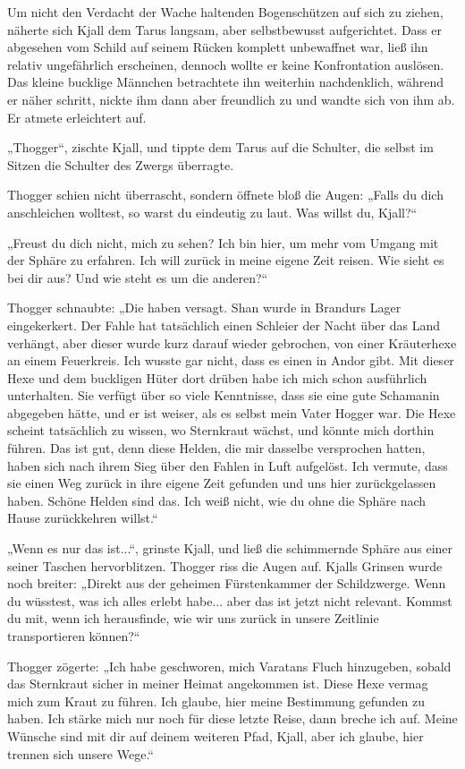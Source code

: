 \documentclass[10pt, a4paper, oneside]{book}
\begin{document}
Um nicht den Verdacht der Wache haltenden Bogenschützen auf sich zu ziehen, näherte sich Kjall dem Tarus langsam, aber selbstbewusst aufgerichtet. Dass er abgesehen vom Schild auf seinem Rücken komplett unbewaffnet war, ließ ihn relativ ungefährlich erscheinen, dennoch wollte er keine Konfrontation auslösen. Das kleine bucklige Männchen betrachtete ihn weiterhin nachdenklich, während er näher schritt, nickte ihm dann aber freundlich zu und wandte sich von ihm ab. Er atmete erleichtert auf.

„Thogger“, zischte Kjall, und tippte dem Tarus auf die Schulter, die selbst im Sitzen die Schulter des Zwergs überragte.

Thogger schien nicht überrascht, sondern öffnete bloß die Augen: „Falls du dich anschleichen wolltest, so warst du eindeutig zu laut. Was willst du, Kjall?“

„Freust du dich nicht, mich zu sehen? Ich bin hier, um mehr vom Umgang mit der Sphäre zu erfahren. Ich will zurück in meine eigene Zeit reisen. Wie sieht es bei dir aus? Und wie steht es um die anderen?“

Thogger schnaubte: „Die haben versagt. Shan wurde in Brandurs Lager eingekerkert. Der Fahle hat tatsächlich einen Schleier der Nacht über das Land verhängt, aber dieser wurde kurz darauf wieder gebrochen, von einer Kräuterhexe an einem Feuerkreis. Ich wusste gar nicht, dass es einen in Andor gibt. Mit dieser Hexe und dem buckligen Hüter dort drüben habe ich mich schon ausführlich unterhalten. Sie verfügt über so viele Kenntnisse, dass sie eine gute Schamanin abgegeben hätte, und er ist weiser, als es selbst mein Vater Hogger war. Die Hexe scheint tatsächlich zu wissen, wo Sternkraut wächst, und könnte mich dorthin führen. Das ist gut, denn diese Helden, die mir dasselbe versprochen hatten, haben sich nach ihrem Sieg über den Fahlen in Luft aufgelöst. Ich vermute, dass sie einen Weg zurück in ihre eigene Zeit gefunden und uns hier zurückgelassen haben. Schöne Helden sind das. Ich weiß nicht, wie du ohne die Sphäre nach Hause zurückkehren willst.“

„Wenn es nur das ist...“, grinste Kjall, und ließ die schimmernde Sphäre aus einer seiner Taschen hervorblitzen. Thogger riss die Augen auf. Kjalls Grinsen wurde noch breiter: „Direkt aus der geheimen Fürstenkammer der Schildzwerge. Wenn du wüsstest, was ich alles erlebt habe... aber das ist jetzt nicht relevant. Kommst du mit, wenn ich herausfinde, wie wir uns zurück in unsere Zeitlinie transportieren können?“

Thogger zögerte: „Ich habe geschworen, mich Varatans Fluch hinzugeben, sobald das Sternkraut sicher in meiner Heimat angekommen ist. Diese Hexe vermag mich zum Kraut zu führen. Ich glaube, hier meine Bestimmung gefunden zu haben. Ich stärke mich nur noch für diese letzte Reise, dann breche ich auf. Meine Wünsche sind mit dir auf deinem weiteren Pfad, Kjall, aber ich glaube, hier trennen sich unsere Wege.“
\end{document}
